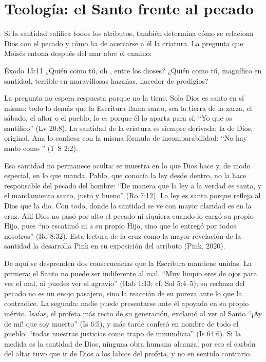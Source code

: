 \section{Teología: el Santo frente al pecado}

Si la santidad califica todos los atributos, también determina cómo se relaciona Dios con el pecado y cómo ha de acercarse a él la criatura. La pregunta que Moisés entona después del mar abre el camino:

\begin{verso}{Éxodo 15:11}
¿Quién como tú, oh \SENOR{}, entre los dioses? ¿Quién como tú, magnífico en santidad, terrible en maravillosas hazañas, hacedor de prodigios?
\end{verso}

La pregunta no espera respuesta porque no la tiene. Solo Dios es santo en sí mismo; todo lo demás que la Escritura llama santo, sea la tierra de la zarza, el sábado, el altar o el pueblo, lo es porque él lo aparta para sí: ``Yo \SENOR{} que os santifico'' (Lv 20:8). La santidad de la criatura es siempre derivada; la de Dios, original. Ana lo confiesa con la misma fórmula de incomparabilidad: ``No hay santo como \SENOR{}'' (1~S 2:2).

Esa santidad no permanece oculta: se muestra en lo que Dios hace y, de modo especial, en lo que manda. Pablo, que conocía la ley desde dentro, no la hace responsable del pecado del hombre: ``De manera que la ley a la verdad es santa, y el mandamiento santo, justo y bueno'' (Ro 7:12). La ley es santa porque refleja al Dios que la dio. Con todo, donde la santidad se ve con mayor claridad es en la cruz. Allí Dios no pasó por alto el pecado ni siquiera cuando lo cargó su propio Hijo, pues ``no escatimó ni a su propio Hijo, sino que lo entregó por todos nosotros'' (Ro 8:32). Esta lectura de la cruz como la mayor revelación de la santidad la desarrolla Pink en su exposición del atributo (Pink, 2020).

De aquí se desprenden dos consecuencias que la Escritura mantiene unidas. La primera: el Santo no puede ser indiferente al mal. ``Muy limpio eres de ojos para ver el mal, ni puedes ver el agravio'' (Hab 1:13; cf. Sal 5:4--5); su rechazo del pecado no es un enojo pasajero, sino la reacción de su pureza ante lo que la contradice. La segunda: nadie puede presentarse ante él apoyado en su propio mérito. Isaías, el profeta más recto de su generación, exclamó al ver al Santo ``¡Ay de mí! que soy muerto'' (Is 6:5), y más tarde confesó en nombre de todo el pueblo: ``todas nuestras justicias como trapo de inmundicia'' (Is 64:6). Si la medida es la santidad de Dios, ninguna obra humana alcanza; por eso el carbón del altar tuvo que ir de Dios a los labios del profeta, y no en sentido contrario.

